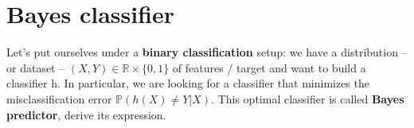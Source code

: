 \section{Bayes classifier}

\begin{tcolorbox}[width=\linewidth, sharp corners=all, colback=white!95!black]
Let's put ourselves under a \textbf{binary classification} setup: we have a distribution -- or dataset -- $(X, Y) \in \mathbb{R} \times \{0,1\}$ of features / target and want to build a classifier h.\newline
In particular, we are looking for a classifier that minimizes the misclassification error $\mathbb{P}(h(X) \neq Y \vert X)$. This optimal classifier is called \textbf{Bayes predictor}, derive its expression.

\end{tcolorbox}




